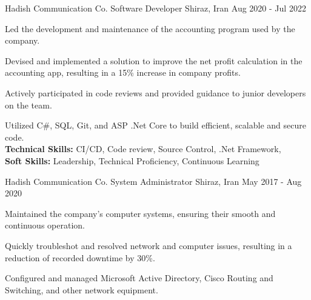 

\begin{cventries}

    \cventry
    {Hadish Communication Co.} %
    {Software Developer} %
    {Shiraz, Iran} %
    {Aug 2020 - Jul 2022} %
    {
      \begin{cvitems} %
        \item {Led the development and maintenance of the accounting program used by the company.}
        \item {Devised and implemented a solution to improve the net profit calculation in the accounting app, resulting in a 15\% increase in company profits.}
        \item {Actively participated in code reviews and provided guidance to junior developers on the team.}
        \item {Utilized C\#, SQL, Git, and ASP .Net Core to build efficient, scalable and secure code.
        \\\textbf{Technical Skills:} CI/CD, Code review, Source Control, .Net Framework, 
        \\\textbf{Soft Skills:} Leadership, Technical Proficiency, Continuous Learning}%
      \end{cvitems}
    }%
    \cventry
    {Hadish Communication Co.} %
    {System Administrator} %
    {Shiraz, Iran} %
    {May 2017 - Aug 2020} %
    {
      \begin{cvitems} %
        \item {Maintained the company's computer systems, ensuring their smooth and continuous operation.}
        \item {Quickly troubleshot and resolved network and computer issues, resulting in a reduction of recorded downtime by 30\%.}
        \item {Configured and managed Microsoft Active Directory, Cisco Routing and Switching, and other network equipment.}

\end{cvitems}}
\end{cventries}
